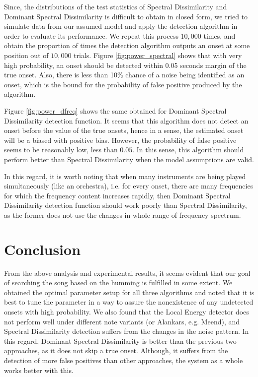 \documentclass[10pt]{article}
\begin{document}
Since, the distributions of the test statistics of Spectral Dissimilarity and Dominant Spectral Dissimilarity is difficult to obtain in closed form, we tried to simulate data from our assumed model and apply the detection algorithm in order to evaluate its performance. We repeat this process $10,000$ times, and obtain the proportion of times the detection algorithm outputs an onset at some position out of $10,000$ trials. Figure \ref{fig:power_spectral} shows that with very high probability, an onset should be detected within 0.05 seconds margin of the true onset. Also, there is less than 10\% chance of a noise being identified as an onset, which is the bound for the probability of false positive produced by the algorithm.

Figure \ref{fig:power_dfreq} shows the same obtained for Dominant Spectral Dissimilarity detection function. It seems that this algorithm does not detect an onset before the value of the true onsets, hence in a sense, the estimated onset will be a biased with positive bias. However, the probability of false positive seems to be reasonably low, less than $0.05$. In this sense, this algorithm should perform better than Spectral Dissimilarity when the model assumptions are valid.

In this regard, it is worth noting that when many instruments are being played simultaneously (like an orchestra), i.e. for every onset, there are many frequencies for which the frequency content increases rapidly, then Dominant Spectral Dissimilarity detection function should work poorly than Spectral Dissimilarity, as the former does not use the changes in whole range of frequency spectrum.

\section{Conclusion}
\qquad From the above analysis and experimental results, it seems evident that our goal of searching the song based on the humming is fulfilled in some extent. We obtained the optimal parameter setup for all three algorithms and noted that it is best to tune the parameter in a way to assure the nonexistence of any undetected onsets with high probability. We also found that the Local Energy detector does not perform well under different note variants (or Alankars, e.g. Meend), and Spectral Dissimilarity detection suffers from the changes in the noise pattern. In this regard, Dominant Spectral Dissimilarity is better than the previous two approaches, as it does not skip a true onset. Although, it suffers from the detection of more false positives than other approaches, the system as a whole works better with this.
\end{document}
